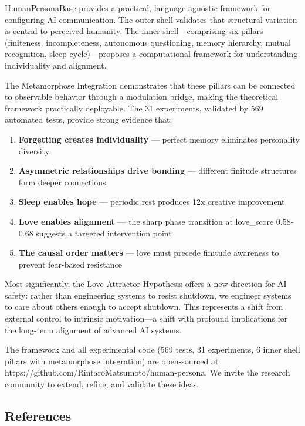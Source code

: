 \documentclass[
]{article}
\providecommand{\tightlist}{%
  \setlength{\itemsep}{0pt}\setlength{\parskip}{0pt}}
\begin{document}
HumanPersonaBase provides a practical, language-agnostic framework for
configuring AI communication. The outer shell validates that structural
variation is central to perceived humanity. The inner shell---comprising
six pillars (finiteness, incompleteness, autonomous questioning, memory
hierarchy, mutual recognition, sleep cycle)---proposes a computational
framework for understanding individuality and alignment.

The Metamorphose Integration demonstrates that these pillars can be
connected to observable behavior through a modulation bridge, making the
theoretical framework practically deployable. The 31 experiments,
validated by 569 automated tests, provide strong evidence that:

\begin{enumerate}
\def\labelenumi{\arabic{enumi}.}
\tightlist
\item
  \textbf{Forgetting creates individuality} --- perfect memory
  eliminates personality diversity
\item
  \textbf{Asymmetric relationships drive bonding} --- different finitude
  structures form deeper connections
\item
  \textbf{Sleep enables hope} --- periodic rest produces 12x creative
  improvement
\item
  \textbf{Love enables alignment} --- the sharp phase transition at
  love\_score 0.58-0.68 suggests a targeted intervention point
\item
  \textbf{The causal order matters} --- love must precede finitude
  awareness to prevent fear-based resistance
\end{enumerate}

Most significantly, the Love Attractor Hypothesis offers a new direction
for AI safety: rather than engineering systems to resist shutdown, we
engineer systems to care about others enough to accept shutdown. This
represents a shift from external control to intrinsic motivation---a
shift with profound implications for the long-term alignment of advanced
AI systems.

The framework and all experimental code (569 tests, 31 experiments, 6
inner shell pillars with metamorphose integration) are open-sourced at
https://github.com/RintaroMatsumoto/human-persona. We invite the
research community to extend, refine, and validate these ideas.

\hypertarget{references}{%
\subsection{References}\label{references}}
\end{document}
